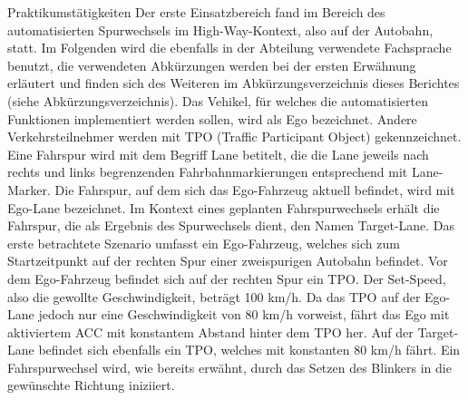 Praktikumstätigkeiten
Der erste Einsatzbereich fand im Bereich des automatisierten Spurwechsels im High-Way-Kontext, also auf der Autobahn, statt. Im Folgenden wird die ebenfalls in der Abteilung verwendete Fachsprache benutzt, die verwendeten Abkürzungen werden bei der ersten Erwähnung erläutert und finden sich des Weiteren im Abkürzungsverzeichnis dieses Berichtes (siehe Abkürzungsverzeichnis). Das Vehikel, für welches die automatisierten Funktionen implementiert werden sollen, wird als Ego bezeichnet. Andere Verkehrsteilnehmer werden mit TPO (Traffic Participant Object) gekennzeichnet. Eine Fahrspur wird mit dem Begriff Lane betitelt, die die Lane jeweils nach rechts und links begrenzenden Fahrbahnmarkierungen entsprechend mit Lane-Marker. Die Fahrspur, auf dem sich das Ego-Fahrzeug aktuell befindet, wird mit Ego-Lane bezeichnet. Im Kontext eines geplanten Fahrspurwechsels erhält die Fahrspur, die als Ergebnis des Spurwechsels dient, den Namen Target-Lane. Das erste betrachtete Szenario umfasst ein Ego-Fahrzeug, welches sich zum Startzeitpunkt auf der rechten Spur einer zweispurigen Autobahn befindet. Vor dem Ego-Fahrzeug befindet sich auf der rechten Spur ein TPO. Der Set-Speed, also die gewollte Geschwindigkeit, beträgt 100 km/h. Da das TPO auf der Ego-Lane jedoch nur eine Geschwindigkeit von 80 km/h vorweist, fährt das Ego mit aktiviertem ACC mit konstantem Abstand hinter dem TPO her. Auf der Target-Lane befindet sich ebenfalls ein TPO, welches mit konstanten 80 km/h fährt. Ein Fahrspurwechsel wird, wie bereits erwähnt, durch das Setzen des Blinkers in die gewünschte Richtung iniziiert. 